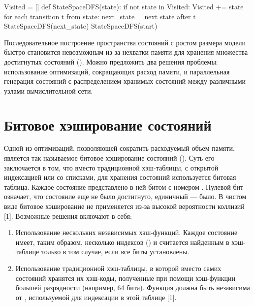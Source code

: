 \documentclass[utf8]{G7-32}
\begin{document}
\begin{CodeBlock}
Visited = []
def StateSpaceDFS(state):
    if not state in Visited:
        Visited += state
        for each transition t from state:
            next_state = next state after t
            StateSpaceDFS(next_state)
StateSpaceDFS(start)
\end{CodeBlock}

Последовательное построение пространства состояний с ростом размера
модели быстро становится невозможным из-за нехватки памяти для
хранения множества достигнутых состояний (). Можно предложить
два решения проблемы: использование оптимизаций, сокращающих расход
памяти, и параллельная генерация состояний с распределением хранимых
состояний между различными узлами вычислительной сети.

\section{Битовое хэширование состояний}
\label{sec:bit-hashing}

Одной из оптимизаций, позволяющей сократить расходуемый объем памяти,
является так называемое битовое хэширование состояний (). Суть его заключается в том, что вместо традиционной
хэш-таблицы, с открытой индексацией или со списками, для хранения
состояний используется битовая таблица. Каждое состояние 
представлено в ней битом с номером . Нулевой бит означает,
что состояние еще не было достигнуто, единичный — было. В чистом виде
битовое хэширование не применяется из-за высокой вероятности коллизий
[1]. Возможные решения включают в себя:

\begin{enumerate}
\item Использование нескольких независимых хэш-функций. Каждое
  состояние имеет, таким образом, несколько индексов () и считается найденным в
  хэш-таблице только в том случае, если все биты 
  установлены.

\item Использование традиционной хэш-таблицы, в которой вместо самих
  состояний хранятся их хэш-коды, полученные при помощи хэш-функции
   большей разрядности (например, 64 бита). Функция 
  должна быть независима от , используемой для индексации в этой
  таблице [1].
\end{enumerate}
\end{document}
